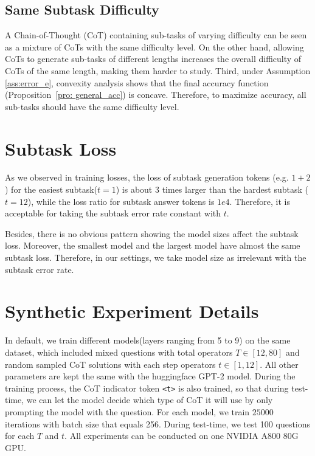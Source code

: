 \subsection{Same Subtask Difficulty}
\label{app:same_length}

A Chain-of-Thought (CoT) containing sub-tasks of varying difficulty can be seen as a mixture of CoTs with the same difficulty level. On the other hand, allowing CoTs to generate sub-tasks of different lengths increases the overall difficulty of CoTs of the same length, making them harder to study. Third, under Assumption \ref{ass:error_e}, convexity analysis shows that the final accuracy function (Proposition~\ref{pro: general_acc}) is concave. Therefore, to maximize accuracy, all sub-tasks should have the same difficulty level.




\section{Subtask Loss}
\label{app:subtask}
As we observed in training losses, the loss of subtask generation tokens (e.g. $1+2$) for the easiest subtask($t=1$) is about 3 times larger than the hardest subtask ($t=12$), while the loss ratio for subtask answer tokens is $1e4$. Therefore, it is acceptable for taking the subtask error rate constant with $t$.

Besides, there is no obvious pattern showing the model sizes affect the subtask loss. Moreover, the smallest model and the largest model have almost the same subtask loss. Therefore, in our settings, we take model size as irrelevant with the subtask error rate.





\section{Synthetic Experiment Details}
\label{app:syn}
In default, we train different models(layers ranging from 5 to 9) on the same dataset, which included mixed questions with total operators $T \in [12,80]$ and random sampled CoT solutions with each step operators $t \in [1,12]$. All other parameters are kept the same with the huggingface GPT-2 model. During the training process, the CoT indicator token \texttt{<t>} is also trained, so that during test-time, we can let the model decide which type of CoT it will use by only prompting the model with the question. For each model, we train $25000$ iterations with batch size that equals 256. During test-time, we test 100 questions for each $T$ and $t$. All experiments can be conducted on one NVIDIA A800 80G GPU. 




